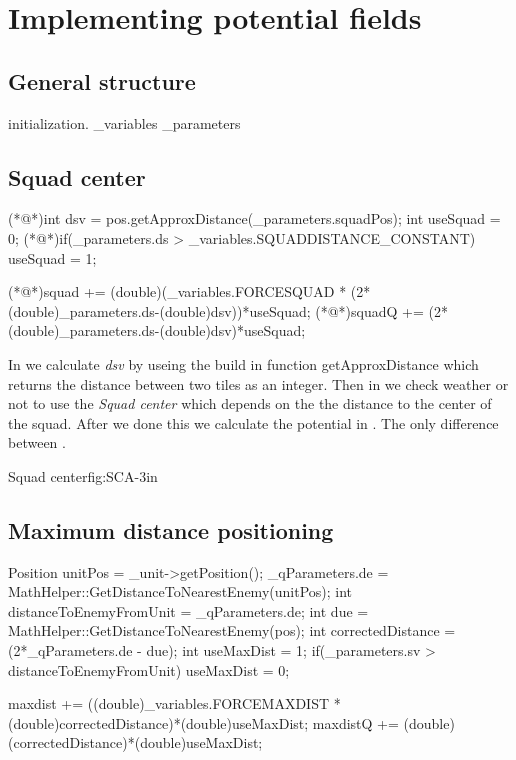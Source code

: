 \section{Implementing potential fields}
	
	\subsection{General structure}
	initialization.
	 _variables
	 _parameters
	 
	
	\subsection{Squad center}	
		\begin{Sourcecode}[caption=Squad center]
(*@\lnote@*)int dsv = pos.getApproxDistance(_parameters.squadPos);	
int useSquad = 0;
(*@\lnote@*)if(_parameters.ds > _variables.SQUADDISTANCE_CONSTANT)
	useSquad = 1;

(*@\lnote@*)squad += (double)(_variables.FORCESQUAD * (2*(double)_parameters.ds-(double)dsv))*useSquad;
(*@\lnote@*)squadQ += (2*(double)_parameters.ds-(double)dsv)*useSquad;
\end{Sourcecode}
		In  we calculate \textit{dsv} by useing the build in function getApproxDistance which returns the distance between two tiles as an integer.
		Then in  we check weather or not to use the \textit{Squad center} which depends on the the distance to the center of the squad.
		After we done this we calculate the potential in . The only difference between .

			{Squad center}{fig:SCA}{-3in}
			
	\subsection{Maximum distance positioning}
		\begin{Sourcecode}[caption=Maximum distance]
Position unitPos = _unit->getPosition();
_qParameters.de = MathHelper::GetDistanceToNearestEnemy(unitPos);
int distanceToEnemyFromUnit = _qParameters.de;
int due = MathHelper::GetDistanceToNearestEnemy(pos);
int correctedDistance = (2*_qParameters.de - due);
int useMaxDist = 1;
if(_parameters.sv > distanceToEnemyFromUnit)
	useMaxDist = 0;


maxdist += ((double)_variables.FORCEMAXDIST * (double)correctedDistance)*(double)useMaxDist;
maxdistQ += (double)(correctedDistance)*(double)useMaxDist;
\end{Sourcecode}
	
